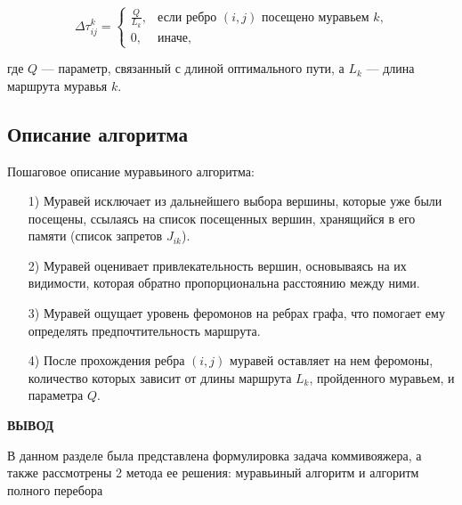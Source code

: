 \begin{equation}
    \label{update_phero_3}
    \Delta \tau_{ij}^k = 
    \begin{cases}
        \frac{Q}{L_k}, & \text{если ребро $(i, j)$ посещено муравьем $k$,} \\
        0, & \text{иначе,}
    \end{cases}
\end{equation}

где $Q$ — параметр, связанный с длиной оптимального пути, а $L_k$ — длина маршрута муравья $k$.

\subsection{Описание алгоритма}
Пошаговое описание муравьиного алгоритма:
\begin{enumerate}
    \item[1)] Муравей исключает из дальнейшего выбора вершины, которые уже были посещены, ссылаясь на список посещенных вершин, хранящийся в его памяти (список запретов $J_{ik}$).
    \item[2)] Муравей оценивает привлекательность вершин, основываясь на их видимости, которая обратно пропорциональна расстоянию между ними.
    \item[3)] Муравей ощущает уровень феромонов на ребрах графа, что помогает ему определять предпочтительность маршрута.
    \item[4)] После прохождения ребра $(i, j)$ муравей оставляет на нем феромоны, количество которых зависит от длины маршрута $L_k$, пройденного муравьем, и параметра $Q$.
\end{enumerate}

\textbf{ВЫВОД}

В данном разделе была представлена формулировка задача коммивояжера, а также рассмотрены 2 метода ее решения: муравьиный алгоритм и алгоритм полного перебора
